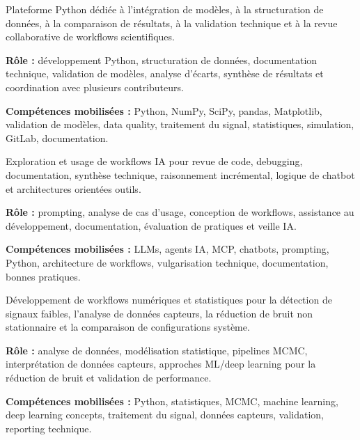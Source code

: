 \documentclass[8pt,a4paper,ragged2e,withhyper]{altacv}
\begin{document}
Plateforme Python dédiée à l’intégration de modèles, à la structuration de données, à la comparaison de résultats, à la validation technique et à la revue collaborative de workflows scientifiques.

\textbf{Rôle :} développement Python, structuration de données, documentation technique, validation de modèles, analyse d’écarts, synthèse de résultats et coordination avec plusieurs contributeurs.

\textbf{Compétences mobilisées :} Python, NumPy, SciPy, pandas, Matplotlib, validation de modèles, data quality, traitement du signal, statistiques, simulation, GitLab, documentation.

\divider


Exploration et usage de workflows IA pour revue de code, debugging, documentation, synthèse technique, raisonnement incrémental, logique de chatbot et architectures orientées outils.

\textbf{Rôle :} prompting, analyse de cas d’usage, conception de workflows, assistance au développement, documentation, évaluation de pratiques et veille IA.

\textbf{Compétences mobilisées :} LLMs, agents IA, MCP, chatbots, prompting, Python, architecture de workflows, vulgarisation technique, documentation, bonnes pratiques.

\divider


Développement de workflows numériques et statistiques pour la détection de signaux faibles, l’analyse de données capteurs, la réduction de bruit non stationnaire et la comparaison de configurations système.

\textbf{Rôle :} analyse de données, modélisation statistique, pipelines MCMC, interprétation de données capteurs, approches ML/deep learning pour la réduction de bruit et validation de performance.

\textbf{Compétences mobilisées :} Python, statistiques, MCMC, machine learning, deep learning concepts, traitement du signal, données capteurs, validation, reporting technique.


\vspace{-.3cm}
\end{document}
